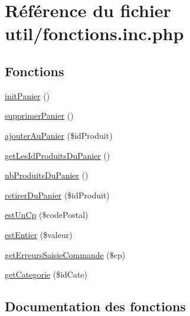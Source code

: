 \hypertarget{fonctions_8inc_8php}{}\section{Référence du fichier util/fonctions.inc.\+php}
\label{fonctions_8inc_8php}
\subsection*{Fonctions}
\begin{DoxyCompactItemize}
\item 
\hyperlink{fonctions_8inc_8php_a7c3f3b6845445b896480e3bd6b9ec6ae}{init\+Panier} ()
\item 
\hyperlink{fonctions_8inc_8php_a6d2472e7b8bc9e7d0f546cece9d4f6c8}{supprimer\+Panier} ()
\item 
\hyperlink{fonctions_8inc_8php_aa9d617d702da2755a6f308ad7748f49d}{ajouter\+Au\+Panier} (\$id\+Produit)
\item 
\hyperlink{fonctions_8inc_8php_a59a95455bd9ca8f5253abd17d3072a97}{get\+Les\+Id\+Produits\+Du\+Panier} ()
\item 
\hyperlink{fonctions_8inc_8php_a40295a28174a0eccf95afe21322bbab7}{nb\+Produits\+Du\+Panier} ()
\item 
\hyperlink{fonctions_8inc_8php_a9abbd8b2a086aad084ad4ebcaa79d740}{retirer\+Du\+Panier} (\$id\+Produit)
\item 
\hyperlink{fonctions_8inc_8php_a84de5caad41b5a853d48722806e001f6}{est\+Un\+Cp} (\$code\+Postal)
\item 
\hyperlink{fonctions_8inc_8php_af8cba6b0c8902dc65b7522b5952b30bf}{est\+Entier} (\$valeur)
\item 
\hyperlink{fonctions_8inc_8php_aba35060e60e80a033b2f7bf612c60b56}{get\+Erreurs\+Saisie\+Commande} (\$cp)
\item 
\hyperlink{fonctions_8inc_8php_a230dfdd0d0b7c24d309159bfd802ff2a}{get\+Categorie} (\$id\+Cate)
\end{DoxyCompactItemize}


\subsection{Documentation des fonctions}
\mbox{\label{fonctions_8inc_8php_aa9d617d702da2755a6f308ad7748f49d}} 
